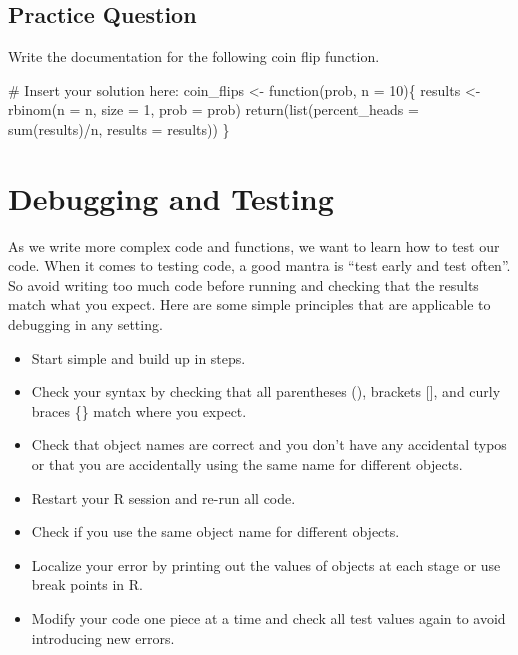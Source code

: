 \documentclass[
  letterpaper,
]{latex/krantz}
\makeatletter
\newenvironment{Shaded}{\begin{snugshade}}{\end{snugshade}}
\newcommand{\AttributeTok}[1]{\textcolor[rgb]{0.40,0.45,0.13}{#1}}
\newcommand{\CommentTok}[1]{\textcolor[rgb]{0.37,0.37,0.37}{#1}}
\newcommand{\ControlFlowTok}[1]{\textcolor[rgb]{0.00,0.23,0.31}{#1}}
\newcommand{\DecValTok}[1]{\textcolor[rgb]{0.68,0.00,0.00}{#1}}
\newcommand{\FunctionTok}[1]{\textcolor[rgb]{0.28,0.35,0.67}{#1}}
\newcommand{\NormalTok}[1]{\textcolor[rgb]{0.00,0.23,0.31}{#1}}
\newcommand{\OtherTok}[1]{\textcolor[rgb]{0.00,0.23,0.31}{#1}}
\newcommand{\SpecialCharTok}[1]{\textcolor[rgb]{0.37,0.37,0.37}{#1}}
\providecommand{\tightlist}{%
  \setlength{\itemsep}{0pt}\setlength{\parskip}{0pt}}\usepackage{longtable,booktabs,array}
\newenvironment{kframe}{%
\medskip{}
\setlength{\fboxsep}{.8em}
 \def\at@end@of@kframe{}%
 \ifinner\ifhmode%
  \def\at@end@of@kframe{\end{minipage}}%
  \begin{minipage}{\columnwidth}%
 \fi\fi%
 \def\FrameCommand##1{\hskip\@totalleftmargin \hskip-\fboxsep
 \colorbox{shadecolor}{##1}\hskip-\fboxsep
     \hskip-\linewidth \hskip-\@totalleftmargin \hskip\columnwidth}%
 \MakeFramed {\advance\hsize-\width
   \@totalleftmargin\z@ \linewidth\hsize
   \@setminipage}}%
 {\par\unskip\endMakeFramed%
 \at@end@of@kframe}
\renewenvironment{Shaded}{\begin{kframe}}{\end{kframe}}
\makeatother
\begin{document}
\subsection{Practice Question}\label{practice-question-28}

Write the documentation for the following coin flip function.

\begin{Shaded}
\begin{Highlighting}[]
\CommentTok{\#\textquotesingle{} Insert your solution here:}
\NormalTok{coin\_flips }\OtherTok{\textless{}{-}} \ControlFlowTok{function}\NormalTok{(prob, }\AttributeTok{n =} \DecValTok{10}\NormalTok{)\{}
\NormalTok{  results }\OtherTok{\textless{}{-}} \FunctionTok{rbinom}\NormalTok{(}\AttributeTok{n =}\NormalTok{ n, }\AttributeTok{size =} \DecValTok{1}\NormalTok{, }\AttributeTok{prob =}\NormalTok{ prob)}
  \FunctionTok{return}\NormalTok{(}\FunctionTok{list}\NormalTok{(}\AttributeTok{percent\_heads =} \FunctionTok{sum}\NormalTok{(results)}\SpecialCharTok{/}\NormalTok{n, }\AttributeTok{results =}\NormalTok{ results))}
\NormalTok{\}}
\end{Highlighting}
\end{Shaded}

\section{\texorpdfstring{Debugging and Testing
}{Debugging and Testing }}\label{debugging-and-testing}

As we write more complex code and functions, we want to learn how to
test our code. When it comes to testing code, a good mantra is ``test
early and test often''. So avoid writing too much code before running
and checking that the results match what you expect. Here are some
simple principles that are applicable to debugging in any setting.

\begin{itemize}
\tightlist
\item
  Start simple and build up in steps.
\item
  Check your syntax by checking that all parentheses (), brackets
  {[}{]}, and curly braces \{\} match where you expect.
\item
  Check that object names are correct and you don't have any accidental
  typos or that you are accidentally using the same name for different
  objects.
\item
  Restart your R session and re-run all code.
\item
  Check if you use the same object name for different objects.
\item
  Localize your error by printing out the values of objects at each
  stage or use break points in R.
\item
  Modify your code one piece at a time and check all test values again
  to avoid introducing new errors.
\end{itemize}
\end{document}
